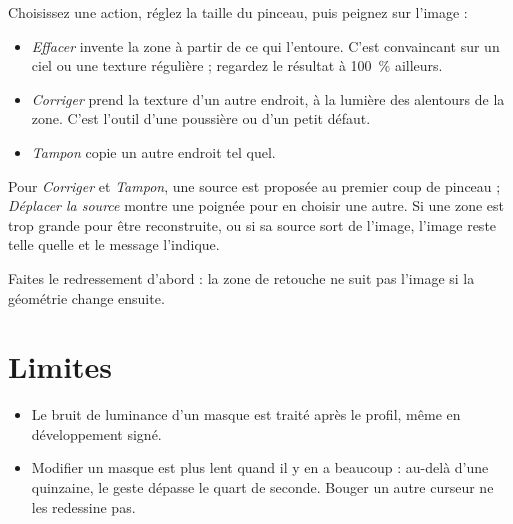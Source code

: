 Choisissez une action, réglez la taille du pinceau, puis peignez sur l’image :
\begin{itemize}
\item \emph{Effacer} invente la zone à partir de ce qui l’entoure. C’est convaincant sur un ciel ou
une texture régulière ; regardez le résultat à 100~\% ailleurs.
\item \emph{Corriger} prend la texture d’un autre endroit, à la lumière des alentours de la zone.
C’est l’outil d’une poussière ou d’un petit défaut.
\item \emph{Tampon} copie un autre endroit tel quel.
\end{itemize}
Pour \emph{Corriger} et \emph{Tampon}, une source est proposée au premier coup de pinceau ;
\emph{Déplacer la source} montre une poignée pour en choisir une autre. Si une zone est trop grande
pour être reconstruite, ou si sa source sort de l’image, l’image reste telle quelle et le message
l’indique.

Faites le redressement d’abord : la zone de retouche ne suit pas l’image si la géométrie
change ensuite.

\section{Limites}
\begin{itemize}
\item Le bruit de luminance d’un masque est traité après le profil, même en développement signé.
\item Modifier un masque est plus lent quand il y en a beaucoup : au-delà d’une quinzaine, le geste
dépasse le quart de seconde. Bouger un autre curseur ne les redessine pas.
\end{itemize}
